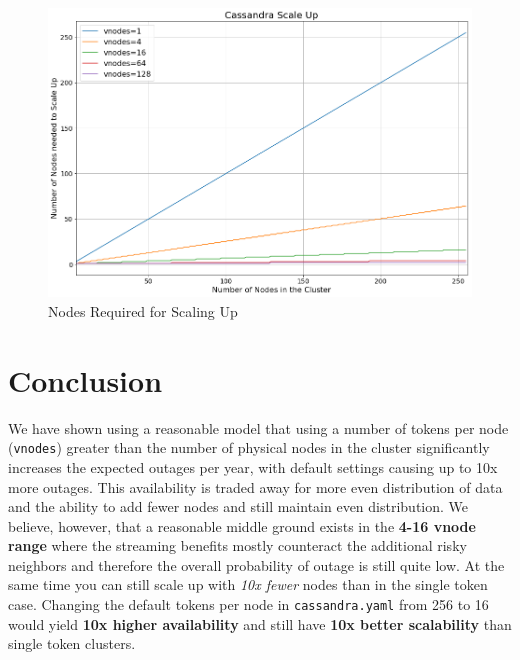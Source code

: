 \documentclass{article}
\begin{document}
\begin{figure}[H]
    \centering
    \includegraphics[width=1.0\textwidth]{images/scale_up.png}
    \caption{Nodes Required for Scaling Up}
    \label{fig:scaling}
\end{figure}


\section{Conclusion}
We have shown using a reasonable model that using a number of tokens per node (\texttt{vnodes}) greater than the number of physical nodes in the cluster significantly increases the expected outages per year, with default settings causing up to 10x more outages. This availability is traded away for more even distribution of data and the ability to add fewer nodes and still maintain even distribution. We believe, however, that a reasonable middle ground exists in the \textbf{4-16 vnode range} where the streaming benefits mostly counteract the additional risky neighbors and therefore the overall probability of outage is still quite low. At the same time you can still scale up with \textit{10x fewer} nodes than in the single token case. Changing the default tokens per node in \texttt{cassandra.yaml} from 256 to 16 would yield \textbf{10x higher availability} and still have \textbf{10x better scalability} than single token clusters.
\end{document}
